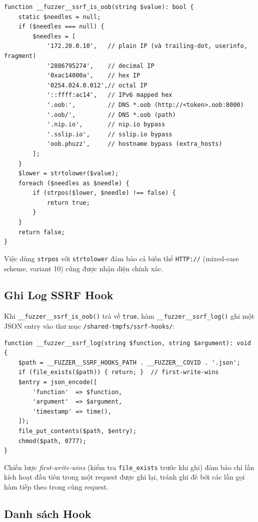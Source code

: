 \begin{verbatim}
function __fuzzer__ssrf_is_oob(string $value): bool {
    static $needles = null;
    if ($needles === null) {
        $needles = [
            '172.20.0.10',   // plain IP (và trailing-dot, userinfo, fragment)
            '2886795274',    // decimal IP
            '0xac14000a',    // hex IP
            '0254.024.0.012',// octal IP
            '::ffff:ac14',   // IPv6 mapped hex
            '.oob:',         // DNS *.oob (http://<token>.oob:8000)
            '.oob/',         // DNS *.oob (path)
            '.nip.io',       // nip.io bypass
            '.sslip.io',     // sslip.io bypass
            'oob.phuzz',     // hostname bypass (extra_hosts)
        ];
    }
    $lower = strtolower($value);
    foreach ($needles as $needle) {
        if (strpos($lower, $needle) !== false) {
            return true;
        }
    }
    return false;
}
\end{verbatim}

Việc dùng \texttt{strpos} với \texttt{strtolower} đảm bảo cả biến thể
\texttt{HTTP://} (mixed-case scheme, variant 10) cũng được nhận diện chính
xác.

\subsection{Ghi Log SSRF Hook}

Khi \texttt{\_\_fuzzer\_\_ssrf\_is\_oob()} trả về \texttt{true}, hàm
\texttt{\_\_fuzzer\_\_ssrf\_log()} ghi một JSON entry vào thư mục
\texttt{/shared-tmpfs/ssrf-hooks/}:

\begin{verbatim}
function __fuzzer__ssrf_log(string $function, string $argument): void {
    $path = __FUZZER__SSRF_HOOKS_PATH . __FUZZER__COVID . '.json';
    if (file_exists($path)) { return; }  // first-write-wins
    $entry = json_encode([
        'function'  => $function,
        'argument'  => $argument,
        'timestamp' => time(),
    ]);
    file_put_contents($path, $entry);
    chmod($path, 0777);
}
\end{verbatim}

Chiến lược \textit{first-write-wins} (kiểm tra \texttt{file\_exists} trước
khi ghi) đảm bảo chỉ lần kích hoạt đầu tiên trong một request được ghi lại,
tránh ghi đè bởi các lần gọi hàm tiếp theo trong cùng request.

\subsection{Danh sách Hook}

